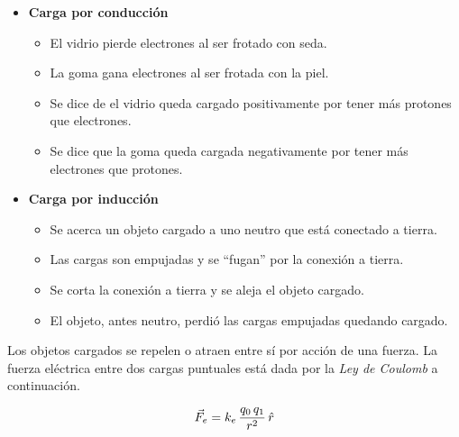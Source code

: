 \begin{itemize}
    \item \textbf{Carga por conducción}
    
    \begin{itemize}
        \item El vidrio pierde electrones al ser frotado con seda.
        \item La goma gana electrones al ser frotada con la piel.
        \item Se dice de el vidrio queda cargado positivamente por tener más protones que electrones.
        \item Se dice que la goma queda cargada negativamente por tener más electrones que protones.
    \end{itemize}

    \item \textbf{Carga por inducción}
    
    \begin{itemize}
        \item Se acerca un objeto cargado a uno neutro que está conectado a tierra.
        \item Las cargas son empujadas y se ``fugan'' por la conexión a tierra.
        \item Se corta la conexión a tierra y se aleja el objeto cargado.
        \item El objeto, antes neutro, perdió las cargas empujadas quedando cargado.
    \end{itemize}

    \begin{center}
        \def\svgwidth{\linewidth}
        
    \end{center}
\end{itemize}

Los objetos cargados se repelen o atraen entre sí por acción de una fuerza.
La fuerza eléctrica entre dos cargas puntuales está dada por la \emph{Ley de Coulomb} a continuación.

\begin{mdframed}[style=DefinitionFrame]
    \begin{defn}
    \end{defn}
    \begin{equation*}
        \Vec{F}_e = k_e \, \frac{ q_0 \, q_1}{r^2} \, \hat{r}
    \end{equation*}
\end{mdframed}


